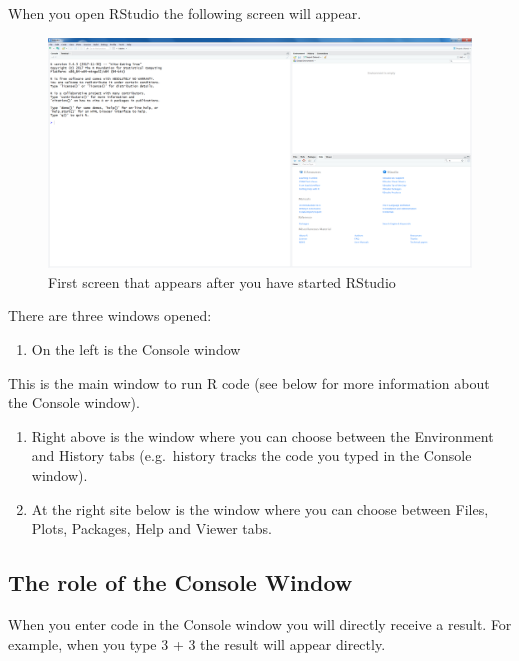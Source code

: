 \documentclass[
]{book}
\providecommand{\tightlist}{%
  \setlength{\itemsep}{0pt}\setlength{\parskip}{0pt}}
\begin{document}
When you open RStudio the following screen will appear.

\begin{figure}

{\centering \includegraphics[width=0.95\linewidth]{images/fig1.10} 

}

\caption{First screen that appears after you have started RStudio}\label{fig:fig10}
\end{figure}

There are three windows opened:

\begin{enumerate}
\def\labelenumi{\arabic{enumi}.}
\tightlist
\item
  On the left is the Console window
\end{enumerate}

This is the main window to run R code (see below for more information
about the Console window).

\begin{enumerate}
\def\labelenumi{\arabic{enumi}.}
\setcounter{enumi}{1}
\item
  Right above is the window where you can choose between the Environment
  and History tabs (e.g.~history tracks the code you typed in the
  Console window).
\item
  At the right site below is the window where you can choose between
  Files, Plots, Packages, Help and Viewer tabs.
\end{enumerate}

\hypertarget{the-role-of-the-console-window}{%
\subsection{The role of the Console
Window}\label{the-role-of-the-console-window}}

When you enter code in the Console window you will directly receive a
result. For example, when you type 3 + 3 the result will appear
directly.
\end{document}
